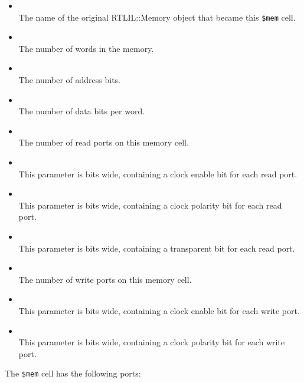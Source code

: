 \begin{itemize}
\item {} \\
The name of the original RTLIL::Memory object that became this {\tt \$mem} cell.

\item {} \\
The number of words in the memory.

\item {} \\
The number of address bits.

\item {} \\
The number of data bits per word.

\item {} \\
The number of read ports on this memory cell.

\item {} \\
This parameter is  bits wide, containing a clock enable bit for each read port.

\item {} \\
This parameter is  bits wide, containing a clock polarity bit for each read port.

\item {} \\
This parameter is  bits wide, containing a transparent bit for each read port.

\item {} \\
The number of write ports on this memory cell.

\item {} \\
This parameter is  bits wide, containing a clock enable bit for each write port.

\item {} \\
This parameter is  bits wide, containing a clock polarity bit for each write port.
\end{itemize}

The {\tt \$mem} cell has the following ports:

